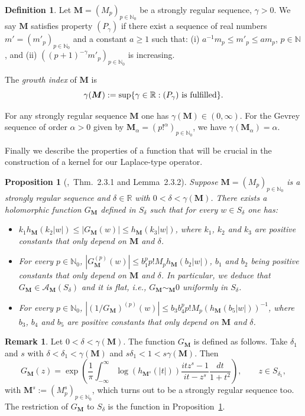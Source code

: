 \documentclass[11pt,a4paper,leqno]{article}
\theoremstyle{plain}
\newtheorem{prop}[theo]{Proposition}
\theoremstyle{definition}
\newtheorem{defin}[theo]{Definition}
\newtheorem{rem}[theo]{Remark}
\def\N{\mathbb{N}}
\def\R{\mathbb{R}}
\def\a{\alpha}
\def\ga{\gamma}
\def\bM{\boldsymbol{M}}
\begin{document}
\begin{defin}
Let $\bM=(M_{p})_{p\in\N_{0}}$ be a strongly regular sequence, $\ga>0$. We say $\bM$ satisfies property $\left(P_{\ga}\right)$  if there exist a sequence of real numbers $m'=(m'_{p})_{p\in\N_0}$ and a constant $a\ge1$ such that: (i) $a^{-1}m_{p}\le m'_{p}\le am_{p}$, $p\in\N$, and (ii) $\left((p+1)^{-\ga}m'_{p}\right)_{p\in\N_0}$ is increasing.

The \textit{growth index} of $\bM$ is
$$\ga(\bM):=\sup\{\ga\in\R:(P_{\ga})\hbox{ is fulfilled}\}.$$
\end{defin}


For any strongly regular sequence $\bM$ one has $\gamma(\bM)\in(0,\infty)$.
For the Gevrey sequence of order $\a>0$ given by $\bM_{\a}=(p!^{\a})_{p\in\N_{0}}$, we have $\ga(\bM_{\a})=\a$.

Finally we describe the properties of a function that will be crucial in the construction of a kernel for our Laplace-type operator.
\begin{prop}[\cite{thilliez},\ Thm.\ 2.3.1 and Lemma\ 2.3.2]\label{gm}
Suppose $\bM=(M_{p})_{p\in\N_0}$ is a strongly regular sequence and $\delta\in\R$ with $0<\delta<\gamma(\bM)$. There exists a holomorphic function $G_{\bM}$ defined in $S_{\delta}$ such that for every $w\in S_{\delta}$ one has:
\begin{itemize}
\item[(i)] $k_{1}h_{\bM}(k_2|w|)\le|G_{\bM}(w)|\le h_{\bM}(k_3|w|)$, where $k_1$, $k_2$ and $k_3$ are positive constants that only depend on $\bM$ and $\delta$.
\item[(ii)] For every $p\in\N_0$, $|G_{\bM}^{(p)}(w)|\le b_1^pp!M_ph_{\bM}(b_2|w|)$, $b_1$ and $b_2$ being positive constants that only depend on $\bM$ and $\delta$. In particular, we deduce that  $G_{\bM}\in\mathcal{A}_{\bM}(S_{\delta})$ and it is flat, i.e., $G_{\bM}\sim_{\bM}0$ uniformly in $S_\delta$.
\item[(iii)]For every $p\in\N_0$, $|(1/G_{\bM})^{(p)}(w)|\le b_3b_4^pp!M_p(h_{\bM}(b_5|w|))^{-1}$, where $b_3$, $b_4$ and $b_5$ are positive constants that only depend on $\bM$ and $\delta$.
\end{itemize}
\end{prop}

\begin{rem}\label{remaConstrG_M}
Let $0<\delta<\gamma(\bM)$. The function $G_{\bM}$ is defined as follows. Take $\delta_1$ and $s$ with $\delta<\delta_1<\gamma(\bM)$ and $s\delta_1<1<s\gamma(\bM)$. Then
\begin{equation}\label{gthilliez} G_{\bM}(z)=\exp\left(\frac{1}{\pi}\int_{-\infty}^{\infty}\log\left(h_{\bM^s}(|t|)\right)\frac{itz^s-1}{it-z^s}\frac{dt}{1+t^2}\right),\qquad z\in S_{\delta_{1}},
\end{equation}
with $\bM^s:=(M_p^{s})_{p\in\N_0}$, which turns out to be a strongly regular sequence too.
The restriction of $G_{\bM}$ to $S_{\delta}$ is the function in Proposition~\ref{gm}.
\end{rem}
\end{document}
